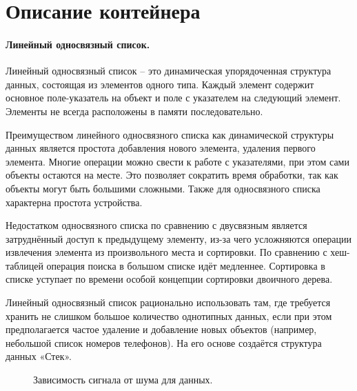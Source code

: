\section{Описание контейнера}

\paragraph{Линейный односвязный список.}


Линейный односвязный список – это динамическая упорядоченная структура данных, состоящая из элементов одного типа. Каждый элемент содержит основное поле-указатель на объект и поле с указателем на следующий элемент. Элементы не всегда расположены в памяти последовательно.

Преимуществом линейного односвязного списка как динамической структуры данных является простота добавления нового элемента, удаления первого элемента. Многие операции можно свести к работе с указателями, при этом сами объекты остаются на месте.
Это позволяет сократить время обработки, так как объекты могут быть большими сложными. Также для односвязного списка характерна простота устройства.

Недостатком односвязного списка по сравнению с двусвязным является затруднённый доступ к предыдущему элементу, из-за чего усложняются операции извлечения элемента из произвольного места и сортировки. По сравнению с хеш-таблицей операция поиска в большом списке идёт медленнее. Сортировка в списке уступает по времени особой концепции сортировки двоичного дерева.

Линейный односвязный список рационально использовать там, где требуется хранить не слишком большое количество однотипных данных, если при этом предполагается частое удаление и добавление новых объектов (например, небольшой список номеров телефонов). На его основе создаётся структура данных «Стек». 

\begin{figure}[h]
\caption{Зависимость сигнала от шума для данных.}
\end{figure}



